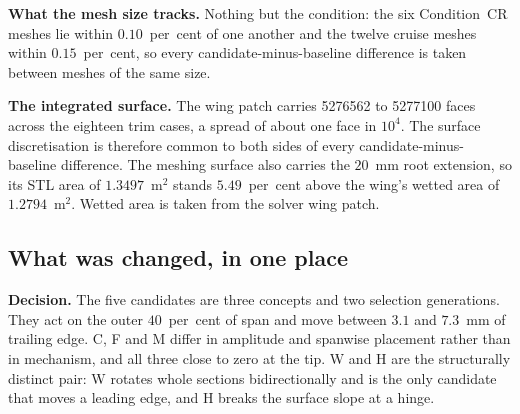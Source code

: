 \textbf{What the mesh size tracks.} Nothing but the condition: the six Condition~CR meshes lie
within $0.10$~per~cent of one another and the twelve cruise meshes within $0.15$~per~cent, so
every candidate-minus-baseline difference is taken between meshes of the same size.

\textbf{The integrated surface.} The wing patch carries \num{5276562} to \num{5277100} faces
across the eighteen trim cases, a spread of about one face in $10^{4}$. The surface discretisation is
therefore common to both sides of every candidate-minus-baseline difference. The meshing surface
also carries the $20$~mm root extension, so its STL area of $1.3497$~m$^2$ stands $5.49$~per~cent
above the wing's wetted area of $1.2794$~m$^2$. Wetted area is taken from the solver wing patch.

\subsection{What was changed, in one place}
\label{sec:geom:summary}

\textbf{Decision.} The five candidates are three concepts and two selection generations. They act
on the outer $40$~per~cent of span and move between $3.1$ and $7.3$~mm of trailing edge. C, F and
M differ in amplitude and spanwise placement rather than in mechanism, and all three close to
zero at the tip. W and H are the structurally distinct pair: W rotates whole sections
bidirectionally and is the only candidate that moves a leading edge, and H breaks the surface
slope at a hinge.
